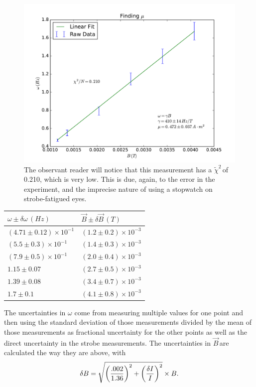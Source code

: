 \documentclass{article}
\newcommand{\redchi}{$\tilde{\chi}^2\,$}
\newcommand{\B}{$\vec{B}\,$}
\DeclarePairedDelimiter{\parens}{\lparen}{\rparen}
\begin{document}
	\begin{figure}[!htb]
		\centering
		\includegraphics[scale=.5]{../plots/omegavsb.pdf}
		\caption{The observant reader will notice that this measurement has a \redchi of 0.210, which is very low.  This is due, again, to the error in the experiment, and the imprecise nature of using a stopwatch on strobe-fatigued eyes.}
	\end{figure}

	\begin{center}
	\begin{tabular}{|l|l|}
		\hline
		$\omega \pm \delta \omega \, (H\!z)$ & $\vec{B} \pm \delta \vec{B} \, (T)$ \\
		\hline
		$(4.71 \pm 0.12) \times 10^{-1}$ & $(1.2 \pm 0.2) \times 10^{-3}$ \\
		$(5.5 \pm 0.3) \times 10^{-1}$   & $(1.4 \pm 0.3) \times 10^{-3}$ \\
		$(7.9 \pm 0.5) \times 10^{-1}$   & $(2.0 \pm 0.4) \times 10^{-3}$ \\
		$1.15 \pm 0.07$ 			     & $(2.7 \pm 0.5) \times 10^{-3}$ \\
		$1.39 \pm 0.08$ 			     & $(3.4 \pm 0.7) \times 10^{-3}$ \\
		$1.7 \pm 0.1$ 				     & $(4.1 \pm 0.8) \times 10^{-3}$ \\
		\hline
	\end{tabular}
	\end{center}

	The uncertainties in $\omega$ come from measuring multiple values for one point and then using the standard deviation of those measurements divided by the mean of those measurements as fractional uncertainty for the other points as well as the direct uncertainty in the strobe measurements. The uncertainties in \B are calculated the way they are above, with
	\begin{equation*}
		\delta B = \sqrt{ \parens*{\frac{.002}{1.36}}^2 + \parens*{\frac{\delta I}{I}}^2 } \times B.
	\end{equation*}
	
\end{document}
